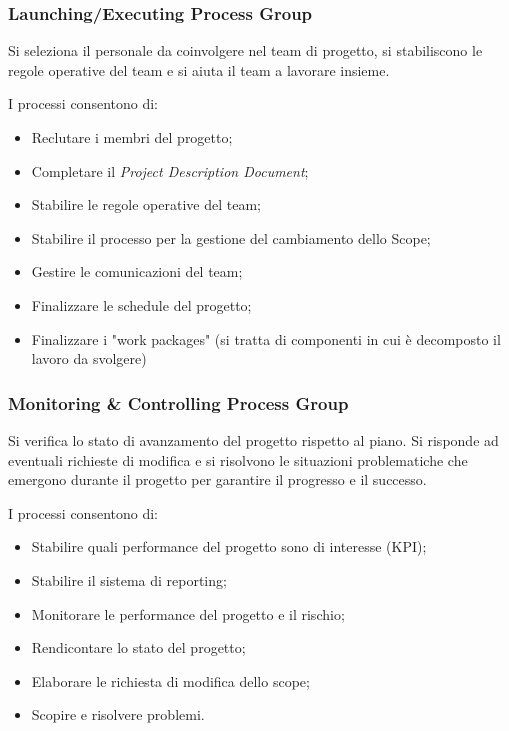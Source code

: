 \subsubsection{Launching/Executing Process Group}
\begin{info}
	Si seleziona il personale da coinvolgere nel team di progetto, si stabiliscono le regole operative del team e si aiuta il team a lavorare insieme.
\end{info}
I processi consentono di:
\begin{itemize}
	\item Reclutare i membri del progetto;
	\item Completare il \textit{Project Description Document};
	\item Stabilire le regole operative del team;
	\item Stabilire il processo per la gestione del cambiamento dello Scope;
	\item Gestire le comunicazioni del team;
	\item Finalizzare le schedule del progetto;
	\item Finalizzare i "work packages" (si tratta di componenti in cui è decomposto il lavoro da svolgere)
\end{itemize}
\subsubsection{Monitoring \& Controlling Process Group}
\begin{info}
	Si verifica lo stato di avanzamento del progetto rispetto al piano. Si risponde ad eventuali richieste di modifica e si risolvono le situazioni problematiche che emergono durante il progetto per garantire il progresso e il successo.
\end{info}
I processi consentono di:
\begin{itemize}
	\item Stabilire quali performance del progetto sono di interesse (KPI);
	\item Stabilire il sistema di reporting;
	\item Monitorare le performance del progetto e il rischio;
	\item Rendicontare lo stato del progetto;
	\item Elaborare le richiesta di modifica dello scope;
	\item Scopire e risolvere problemi.
\end{itemize}
